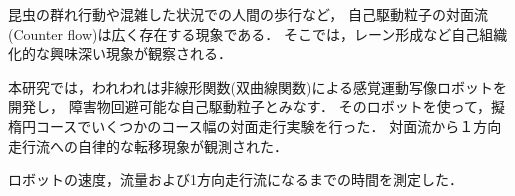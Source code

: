 昆虫の群れ行動や混雑した状況での人間の歩行など，
自己駆動粒子の対面流(Counter flow)は広く存在する現象である．
そこでは，レーン形成など自己組織化的な興味深い現象が観察される．

本研究では，われわれは非線形関数(双曲線関数)による感覚運動写像ロボットを開発し，
障害物回避可能な自己駆動粒子とみなす．
そのロボットを使って，擬楕円コースでいくつかのコース幅の対面走行実験を行った．
対面流から１方向走行流への自律的な転移現象が観測された．

ロボットの速度，流量および1方向走行流になるまでの時間を測定した．
